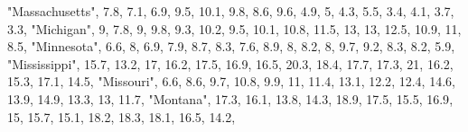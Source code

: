 \documentclass[
]{book}
\newenvironment{Shaded}{\begin{snugshade}}{\end{snugshade}}
\newcommand{\DecValTok}[1]{\textcolor[rgb]{0.00,0.00,0.81}{#1}}
\newcommand{\FloatTok}[1]{\textcolor[rgb]{0.00,0.00,0.81}{#1}}
\newcommand{\NormalTok}[1]{#1}
\newcommand{\StringTok}[1]{\textcolor[rgb]{0.31,0.60,0.02}{#1}}
\begin{document}
\begin{Shaded}
\begin{Highlighting}[]
         \StringTok{"Massachusetts"}\NormalTok{,  }\FloatTok{7.8}\NormalTok{,  }\FloatTok{7.1}\NormalTok{,  }\FloatTok{6.9}\NormalTok{,  }\FloatTok{9.5}\NormalTok{, }\FloatTok{10.1}\NormalTok{,  }\FloatTok{9.8}\NormalTok{,  }\FloatTok{8.6}\NormalTok{,  }\FloatTok{9.6}\NormalTok{,  }\FloatTok{4.9}\NormalTok{,    }\DecValTok{5}\NormalTok{,  }\FloatTok{4.3}\NormalTok{,  }\FloatTok{5.5}\NormalTok{,  }\FloatTok{3.4}\NormalTok{,  }\FloatTok{4.1}\NormalTok{,  }\FloatTok{3.7}\NormalTok{,  }\FloatTok{3.3}\NormalTok{,}
              \StringTok{"Michigan"}\NormalTok{,    }\DecValTok{9}\NormalTok{,  }\FloatTok{7.8}\NormalTok{,    }\DecValTok{9}\NormalTok{,  }\FloatTok{9.8}\NormalTok{,  }\FloatTok{9.3}\NormalTok{, }\FloatTok{10.2}\NormalTok{,  }\FloatTok{9.5}\NormalTok{, }\FloatTok{10.1}\NormalTok{, }\FloatTok{10.8}\NormalTok{, }\FloatTok{11.5}\NormalTok{,   }\DecValTok{13}\NormalTok{,   }\DecValTok{13}\NormalTok{, }\FloatTok{12.5}\NormalTok{, }\FloatTok{10.9}\NormalTok{,   }\DecValTok{11}\NormalTok{,  }\FloatTok{8.5}\NormalTok{,}
             \StringTok{"Minnesota"}\NormalTok{,  }\FloatTok{6.6}\NormalTok{,    }\DecValTok{8}\NormalTok{,  }\FloatTok{6.9}\NormalTok{,  }\FloatTok{7.9}\NormalTok{,  }\FloatTok{8.7}\NormalTok{,  }\FloatTok{8.3}\NormalTok{,  }\FloatTok{7.6}\NormalTok{,  }\FloatTok{8.9}\NormalTok{,    }\DecValTok{8}\NormalTok{,  }\FloatTok{8.2}\NormalTok{,    }\DecValTok{8}\NormalTok{,  }\FloatTok{9.7}\NormalTok{,  }\FloatTok{9.2}\NormalTok{,  }\FloatTok{8.3}\NormalTok{,  }\FloatTok{8.2}\NormalTok{,  }\FloatTok{5.9}\NormalTok{,}
           \StringTok{"Mississippi"}\NormalTok{, }\FloatTok{15.7}\NormalTok{, }\FloatTok{13.2}\NormalTok{,   }\DecValTok{17}\NormalTok{, }\FloatTok{16.2}\NormalTok{, }\FloatTok{17.5}\NormalTok{, }\FloatTok{16.9}\NormalTok{, }\FloatTok{16.5}\NormalTok{, }\FloatTok{20.3}\NormalTok{, }\FloatTok{18.4}\NormalTok{, }\FloatTok{17.7}\NormalTok{, }\FloatTok{17.3}\NormalTok{,   }\DecValTok{21}\NormalTok{, }\FloatTok{16.2}\NormalTok{, }\FloatTok{15.3}\NormalTok{, }\FloatTok{17.1}\NormalTok{, }\FloatTok{14.5}\NormalTok{,}
              \StringTok{"Missouri"}\NormalTok{,  }\FloatTok{6.6}\NormalTok{,  }\FloatTok{8.6}\NormalTok{,  }\FloatTok{9.7}\NormalTok{, }\FloatTok{10.8}\NormalTok{,  }\FloatTok{9.9}\NormalTok{,   }\DecValTok{11}\NormalTok{, }\FloatTok{11.4}\NormalTok{, }\FloatTok{13.1}\NormalTok{, }\FloatTok{12.2}\NormalTok{, }\FloatTok{12.4}\NormalTok{, }\FloatTok{14.6}\NormalTok{, }\FloatTok{13.9}\NormalTok{, }\FloatTok{14.9}\NormalTok{, }\FloatTok{13.3}\NormalTok{,   }\DecValTok{13}\NormalTok{, }\FloatTok{11.7}\NormalTok{,}
               \StringTok{"Montana"}\NormalTok{, }\FloatTok{17.3}\NormalTok{, }\FloatTok{16.1}\NormalTok{, }\FloatTok{13.8}\NormalTok{, }\FloatTok{14.3}\NormalTok{, }\FloatTok{18.9}\NormalTok{, }\FloatTok{17.5}\NormalTok{, }\FloatTok{15.5}\NormalTok{, }\FloatTok{16.9}\NormalTok{,   }\DecValTok{15}\NormalTok{, }\FloatTok{15.7}\NormalTok{, }\FloatTok{15.1}\NormalTok{, }\FloatTok{18.2}\NormalTok{, }\FloatTok{18.3}\NormalTok{, }\FloatTok{18.1}\NormalTok{, }\FloatTok{16.5}\NormalTok{, }\FloatTok{14.2}\NormalTok{,}

\end{Highlighting}
\end{Shaded}
\end{document}
